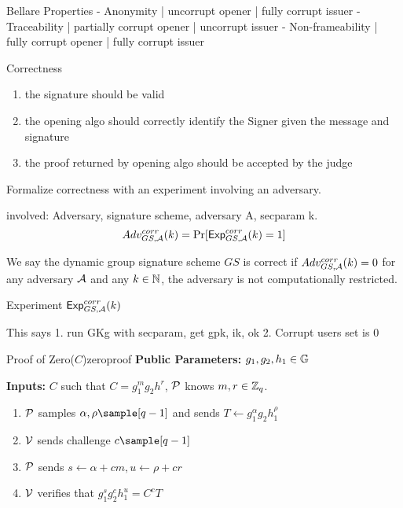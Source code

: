 Bellare
Properties
- Anonymity | uncorrupt opener | fully corrupt issuer
- Traceability | partially corrupt opener | uncorrupt issuer
- Non-frameability | fully corrupt opener | fully corrupt issuer

\cite{bellare_better_2022-1}

Correctness
\begin{enumerate}
    \item the signature should be valid
    \item the opening algo should correctly identify the Signer given the message and signature
    \item the proof returned by opening algo should be accepted by the judge
\end{enumerate}

Formalize correctness with an experiment involving an adversary. 

involved:
Adversary, signature scheme, adversary A, secparam k.
\[
    Adv^{corr}_{GS, \mathcal{A}}(k) = \Pr [\mathsf{Exp}^{corr}_{GS, \mathcal{A}}(k) = 1]
\]

We say the dynamic group signature scheme $GS$ is correct if $Adv^{corr}_{GS,\mathcal{A}}(k) = 0$ for any adversary $\mathcal{A}$ and any $k \in \mathbb{N}$, the adversary is not computationally restricted. 



Experiment $\mathsf{Exp}^{corr}_{GS,\mathcal{A}}(k)$

This says 
1. run GKg with secparam, get gpk, ik, ok
2. Corrupt users set is 0










\newpage

\begin{construction}{Proof of Zero($C$)}{zeroproof}
    \vspace{1em}
    \textbf{Public Parameters:} $g_1, g_2, h_1\in \mathbb{G}$

    \textbf{Inputs:} $C$ such that $C = g_1^{m}g_2h^{r}$, $\mathcal{P}$ knows $m, r \in \mathbb{Z}_q$.
    \vspace{1em}
        \begin{enumerate}
        \item $\mathcal{P}$ samples $\alpha, \rho \sample [q-1]$ and sends $T \gets g_1^{\alpha}g_2h_1^{\rho}$ 

        \item $\mathcal{V}$ sends challenge $c \sample [q-1]$

        \item $\mathcal{P}$ sends $s \gets \alpha + cm, u \gets \rho + cr$

        \item $\mathcal{V}$ verifies that $g_1^sg_2^ch_1^u = C^cT$
    \end{enumerate}
\end{construction}
    

